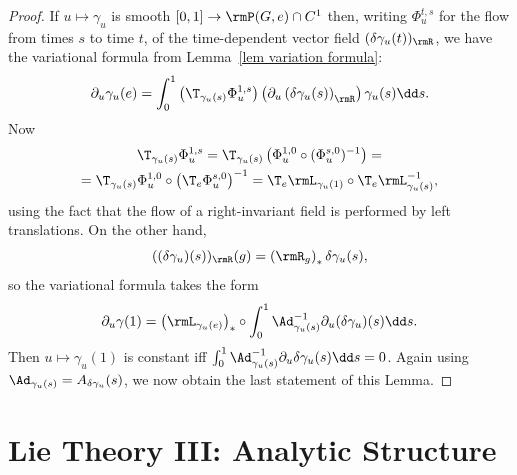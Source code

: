 \begin{proof}
    If $u\mapsto \gamma_u$ is smooth $[0,1]\to \rmP(G,e)\cap C^1$ then, writing $\Phi^{t,s}_u$ for the flow from times $s$ to time $t$, of the time-dependent vector field $(\delta\gamma_u(t))_\rmR$, we have the variational formula from Lemma~\ref{lem variation formula}:
    \[\partial_u\gamma_u(e)=\int_0^1 \left(\T_{\gamma_u(s)}\Phi^{1,s}_u\right)\left(\partial_u \left(\delta\gamma_u(s)\right)_\rmR\right)\gamma_u(s)\dd s.\]
    Now 
    \begin{multline}
        \T_{\gamma_u(s)}\Phi^{1,s}_u=\T_{\gamma_u(s)}\left(\Phi_u^{1,0}\circ (\Phi^{s,0}_u)^{-1}\right)=\\=\T_{\gamma_u(s)}\Phi_u^{1,0}\circ \left(\T_e\Phi^{s,0}_u\right)^{-1}= \T_{e}\rmL_{\gamma_u(1)}\circ \T_e \rmL_{\gamma_u(s)}^{-1},
    \end{multline}
    using the fact that the flow of a right-invariant field is performed by left translations.  On the other hand,
    \[((\delta \gamma_u)(s))_\rmR(g)=\left(\rmR_g\right)_\ast \delta\gamma_u(s),\]
    so the variational formula takes the form
    \[\partial_u\gamma(1)=\left(\rmL_{\gamma_u(e)}\right)_\ast\circ\int_0^1 \Ad_{\gamma_u(s)}^{-1}\partial_u(\delta\gamma_u)(s)\dd s.\]
    Then $u\mapsto\gamma_u(1)$ is constant iff $\int_0^1\Ad_{\gamma_u(s)}^{-1}\partial_u\delta\gamma_u(s)\dd s=0$. Again using $\Ad_{\gamma_u(s)}=A_{\delta \gamma_u}(s)$, we now obtain the last statement of this Lemma.
\end{proof}















\clearpage
\chapter{Lie Theory III: Analytic Structure}\label{sec: Lie theory iii}

